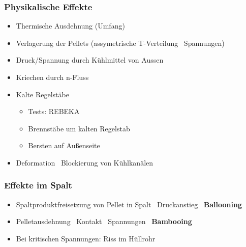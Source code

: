 \documentclass[12pt]{article}
\begin{document}
\subsubsection{Physikalische Effekte}
\begin{itemize}[noitemsep]
	\item Thermische Ausdehnung (Umfang)
	\item Verlagerung der Pellets (assymetrische T-Verteilung \textrightarrow\ Spannungen)
	\item Druck/Spannung durch Kühlmittel von Aussen
	\item Kriechen durch n-Fluss
	\item Kalte Regelstäbe
		\begin{itemize}[noitemsep]
			\item Tests: REBEKA
			\item Brennstäbe um kalten Regelstab
			\item Bersten auf Außenseite
		\end{itemize}
	\item Deformation \textrightarrow\ Blockierung von Kühlkanälen
\end{itemize}

\subsubsection{Effekte im Spalt}
\begin{itemize}[noitemsep]
	\item Spaltproduktfreisetzung von Pellet in Spalt \textrightarrow\ Druckanstieg \textrightarrow\ \textbf{Ballooning}
	\item Pelletausdehnung \textrightarrow\ Kontakt \textrightarrow\ Spannungen \textrightarrow\ \textbf{Bambooing}
	\item Bei kritischen Spannungen: Riss im Hüllrohr
\end{itemize}
\end{document}
